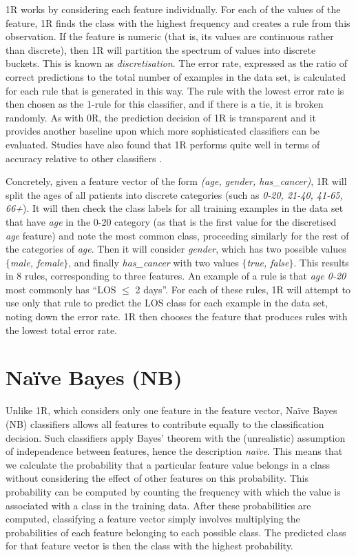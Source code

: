 1R works by considering each feature individually.
For each of the values of the
feature, 1R finds the class with the highest frequency and creates a rule
from this observation. If the feature is numeric (that is, its values are
continuous rather than discrete), then 1R will partition the spectrum of
values into discrete buckets. This is known as \textit{discretisation}.
The error rate, expressed as the ratio of correct predictions to the total
number of examples in the data set,
is calculated for each rule that is generated
in this way. The rule with the lowest error rate is then chosen as the 1-rule
for this classifier,
and if there is a tie, it is broken randomly. As with 0R, the prediction
decision of 1R is transparent and it provides another baseline upon which
more sophisticated classifiers can be evaluated. Studies have also found that
1R performs quite well in terms of accuracy relative to other classifiers
\cite{Holte1993}.

Concretely, given a feature
vector of the form \textit{(age, gender, has\_cancer)},
1R will split the ages of
all patients into discrete categories
(such as \textit{0-20, 21-40, 41-65, 66+}). It
will then check the class labels for all training examples in the data set
that have \textit{age} in the 0-20 category
(as that is the first value for the discretised \textit{age} feature) and
note the most common class, proceeding similarly for the rest of the
categories of \textit{age}. Then it will consider \textit{gender}, which has
two possible values $\{$\textit{male, female}$\}$, and finally \textit{has\_cancer}
with two values $\{$\textit{true, false}$\}$. This results in 8 rules,
corresponding to three features.
An example of a rule is that \textit{age 0-20} most commonly
has ``LOS $\leq$ 2 days''. For each of these rules, 1R will attempt to
use only that rule to predict the LOS class for each example in the data set,
noting down the error rate. 1R then chooses the feature that produces rules
with the lowest total error rate.

\section{Na\"{i}ve Bayes (NB)}
Unlike 1R, which considers only one feature in the feature vector, Na\"{i}ve
Bayes (NB) classifiers allows all features to contribute equally to the
classification decision. Such classifiers apply Bayes' theorem with the
(unrealistic) assumption of independence between features, hence the
description \textit{na\"{i}ve}. This means that we
calculate the probability that a particular feature value belongs in a class
without considering the effect of other features on this probability. This
probability can be computed by
counting the frequency with which the value is associated with a class in the
training data. After these probabilities are computed, classifying a feature
vector simply involves multiplying the probabilities of each feature belonging
to each possible class. The predicted class for that feature vector is then the
class with the highest probability.


